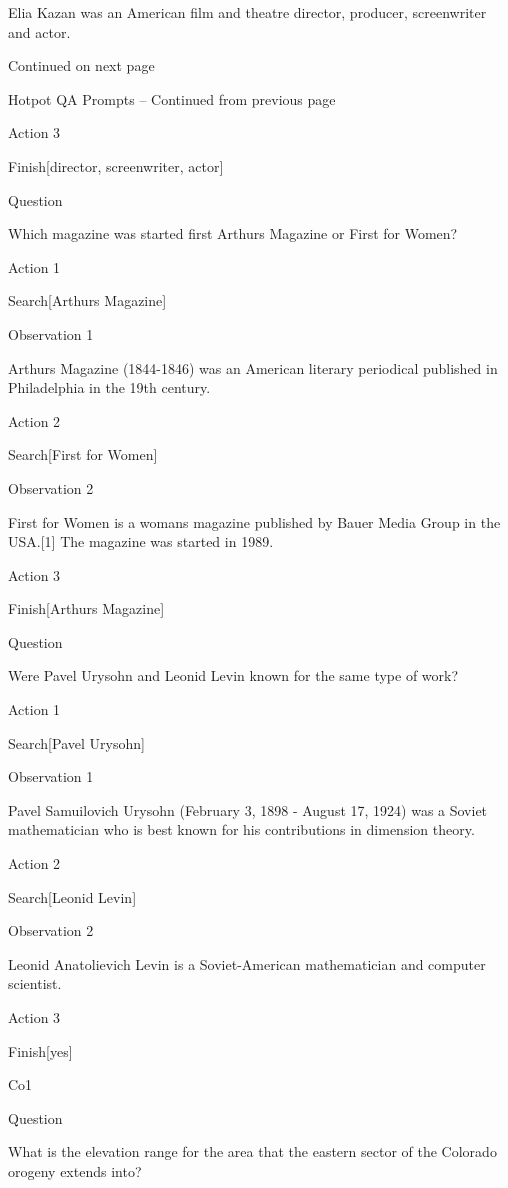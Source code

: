 \documentclass[
]{article}
\begin{document}
Elia Kazan was an American film and theatre director, producer,
screenwriter and actor.

Continued on next page

Hotpot QA Prompts -- Continued from previous page

Action 3

Finish{[}director, screenwriter, actor{]}

Question

Which magazine was started first Arthur\textquotesingle s Magazine or
First for Women?

Action 1

Search{[}Arthur\textquotesingle s Magazine{]}

Observation 1

Arthur\textquotesingle s Magazine (1844-1846) was an American literary
periodical published in Philadelphia in the 19th century.

Action 2

Search{[}First for Women{]}

Observation 2

First for Women is a woman\textquotesingle s magazine published by Bauer
Media Group in the USA.{[}1{]} The magazine was started in 1989.

Action 3

Finish{[}Arthur\textquotesingle s Magazine{]}

Question

Were Pavel Urysohn and Leonid Levin known for the same type of work?

Action 1

Search{[}Pavel Urysohn{]}

Observation 1

Pavel Samuilovich Urysohn (February 3, 1898 - August 17, 1924) was a
Soviet mathematician who is best known for his contributions in
dimension theory.

Action 2

Search{[}Leonid Levin{]}

Observation 2

Leonid Anatolievich Levin is a Soviet-American mathematician and
computer scientist.

Action 3

Finish{[}yes{]}

Co1

Question

What is the elevation range for the area that the eastern sector of the
Colorado orogeny extends into?
\end{document}
